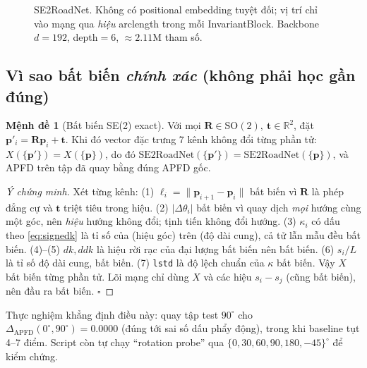 \documentclass[11pt]{article}
\newcommand{\code}[1]{\textcolor{cInk}{\texttt{#1}}}
\newcommand{\R}{\mathbb{R}}
\newcommand{\SOtwo}{\mathrm{SO}(2)}
\newcommand{\kk}{\kappa}
\newcommand{\Rot}{\mathbf{R}}
\newcommand{\pt}{\mathbf{p}}
\newcommand{\tvec}{\mathbf{t}}
\theoremstyle{definition}
\newtheorem{prop}{Mệnh đề}
\begin{document}
\begin{figure}[H]\centering
{}
\caption{SE2RoadNet. Không có positional embedding tuyệt đối; vị trí chỉ vào
mạng qua \emph{hiệu} arclength trong mỗi InvariantBlock. Backbone
$d{=}192$, depth$=6$, $\approx 2.11$M tham số.}
\end{figure}

\subsection{Vì sao bất biến \emph{chính xác} (không phải học gần đúng)}
\begin{prop}[Bất biến SE(2) exact]
Với mọi $\Rot\in\SOtwo,\ \tvec\in\R^2$, đặt $\pt'_i=\Rot\pt_i+\tvec$. Khi đó
vector đặc trưng 7 kênh không đổi từng phần tử: $X(\{\pt'\})=X(\{\pt\})$, do đó
$\mathrm{SE2RoadNet}(\{\pt'\})=\mathrm{SE2RoadNet}(\{\pt\})$, và APFD trên tập
đã quay bằng đúng APFD gốc.
\end{prop}
\begin{proof}[Ý chứng minh]
Xét từng kênh: (1) $\ell_i=\lVert\pt_{i+1}-\pt_i\rVert$ bất biến vì
$\Rot$ là phép đẳng cự và $\tvec$ triệt tiêu trong hiệu. (2) $|\Delta\theta_i|$
bất biến vì quay dịch \emph{mọi} hướng cùng một góc, nên \emph{hiệu} hướng không
đổi; tịnh tiến không đổi hướng. (3) $\kk_i$ có dấu theo \eqref{eq:signedk} là
tỉ số của (hiệu góc) trên (độ dài cung), cả tử lẫn mẫu đều bất biến. (4)--(5)
$dk,ddk$ là hiệu rời rạc của đại lượng bất biến nên bất biến. (6) $s_i/L$ là tỉ
số độ dài cung, bất biến. (7) \code{lstd} là độ lệch chuẩn của $\kk$ bất biến.
Vậy $X$ bất biến từng phần tử. Lõi mạng chỉ dùng $X$ và các hiệu $s_i-s_j$
(cũng bất biến), nên đầu ra bất biến. $\square$
\end{proof}
Thực nghiệm khẳng định điều này: quay tập test $90^\circ$ cho
$\Delta_{\text{APFD}}(0^\circ,90^\circ)=\mathbf{0.0000}$ (đúng tới sai số dấu
phẩy động), trong khi baseline tụt 4--7 điểm. Script còn tự chạy ``rotation
probe'' qua $\{0,30,60,90,180,-45\}^\circ$ để kiểm chứng.
\end{document}

